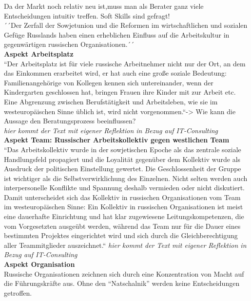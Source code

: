 	Da der Markt noch relativ neu ist,muss man als Berater ganz viele Entscheidungen intuitiv treffen.
	Soft Skills sind gefragt!\\
	
	´´Der Zerfall der Sowjetunion und die Reformen im wirtschaftlichen und sozialen Gefüge Russlands haben einen erheblichen Einfluss auf die Arbeitskultur in gegenwärtigen russischen Organisationen.´´\\
		\textbf{Aspekt Arbeitsplatz}\\
	``Der Arbeitsplatz ist für viele russische Arbeitnehmer nicht nur der Ort, an dem das Einkommen erarbeitet wird, er hat auch eine große soziale Bedeutung: Familienangehörige von Kollegen kennen sich untereinander, wenn der Kindergarten geschlossen hat, bringen 
	Frauen ihre Kinder mit zur Arbeit etc. Eine Abgrenzung zwischen Berufstätigkeit und Arbeitsleben, wie sie im westeuropäischen Sinne üblich ist, wird nicht vorgenommen.``-> Wie kann die Aussage den Beratungsprozess beeinflussen?\\
	\textit{hier kommt der Text mit eigener Reflektion in Bezug auf IT-Consulting}\\
	\textbf{Aspekt Team: Russischer Arbeitskollektiv gegen westlichen Team}\\
	``Das Arbeitskollektiv wurde in der sowjetischen 
	Epoche als das zentrale soziale Handlungsfeld propagiert und die Loyalität gegenüber dem 
	Kollektiv wurde als Ausdruck der politischen Einstellung gewertet. Die Geschlossenheit 
	der Gruppe ist wichtiger als die Selbstverwirklichung des Einzelnen. Nicht selten werden 
	auch interpersonelle Konflikte und Spannung deshalb vermieden oder nicht diskutiert. 
	Damit unterscheidet sich das Kollektiv in russischen Organisationen vom Team im 
	westeuropäischen Sinne: Ein Kollektiv in russischen Organisationen ist meist eine 
	dauerhafte Einrichtung und hat klar zugewiesene Leitungskompetenzen, die vom 
	Vorgesetzten ausgeübt werden, während das Team nur für die Dauer eines bestimmten 
	Projektes eingerichtet wird und sich durch die Gleichberechtigung aller Teammitglieder 
	auszeichnet.`` 	%
	\textit{hier kommt der Text mit eigener Reflektion in Bezug auf IT-Consulting}
	\\
	\textbf{Aspekt Organisation}\\
	Russische Organisationen zeichnen sich durch eine Konzentration von Macht auf die 
	Führungskräfte aus. Ohne den “Natschalnik” werden keine Entscheidungen getroffen. 
